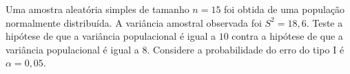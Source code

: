 %
%


\begin{exercicioBanco}[\valorquestao]
    Uma amostra aleatória simples de tamanho $n = 15$ foi obtida de uma população normalmente distribuída. A variância amostral observada foi $S^2 = 18{,}6$. Teste a hipótese de que a variância populacional é igual a $10$ contra a hipótese de que a variância populacional é igual a $8$. Considere a probabilidade do erro do tipo I é $\alpha = 0{,}05$.
\end{exercicioBanco}

